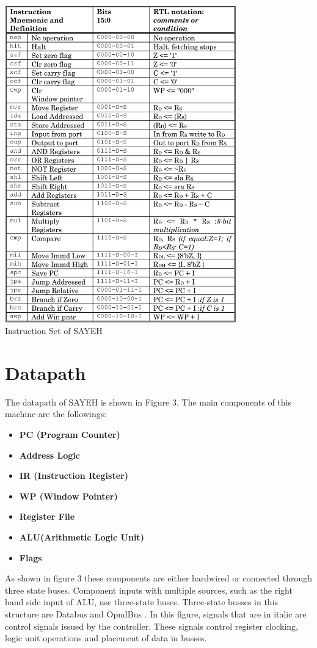 \documentclass{report}
\begin{document}
\begin{table}[H]
	\centering
	\includegraphics[width=0.75\textwidth]{figs/table1}\\
	\caption{Instruction Set of SAYEH}
\end{table}

\section{Datapath}
The datapath of SAYEH is shown in Figure 3. The main components of this machine are the followings:
\begin{itemize}
	\item \textbf{PC (Program Counter)}
	\item \textbf{Address Logic}
	\item \textbf{IR (Instruction Register)}
	\item \textbf{WP (Window Pointer)}
	\item \textbf{Register File}
	\item \textbf{ALU(Arithmetic Logic Unit)}
	\item \textbf{Flags}
\end{itemize}

\par As shown in figure 3 these components are either hardwired or connected through three state buses. Component inputs with multiple sources, such as the right hand side input of ALU, use three-state buses. Three-state busses in this structure are Databus and OpndBus . In this figure, signals that are in italic are control signals issued by the controller. These signals control register clocking, logic unit operations and placement of data in busses.
\end{document}
